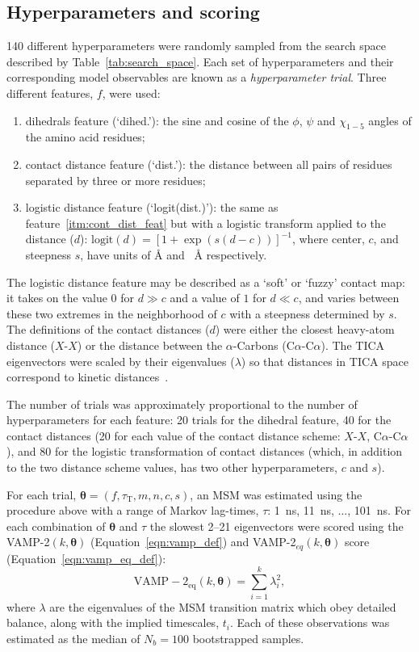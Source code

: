 \documentclass[journal=jacsat,manuscript=article]{achemso}
\begin{document}
\subsection{Hyperparameters and scoring}
\num{140} different hyperparameters were randomly sampled from the search space described by Table~\ref{tab:search_space}. Each set of hyperparameters and their corresponding model observables are known as a \emph{hyperparameter trial}. Three different features, $f$, were used: 
\begin{enumerate}
    \item dihedrals feature (`dihed.'): the sine and cosine of the $\phi$, $\psi$ and $\chi_{1-5}$ angles of the amino acid residues;
    \item contact distance feature (`dist.'): the distance between all pairs of residues separated by three or more residues; \label{itm:cont_dist_feat}
    \item logistic distance feature (`logit(dist.)'): the same as feature~\ref{itm:cont_dist_feat} but with a logistic transform applied to the distance ($d$): $\mathrm{logit}(d) = [1+\exp{(s(d-c))}]^{-1}$, where center, $c$, and steepness $s$,  have units of \si{\angstrom} and \si{\per\angstrom} respectively.
\end{enumerate}
The logistic distance feature may be described as a `soft' or `fuzzy' contact map: it takes on the value $0$ for $d \gg c$ and a value of $1$ for $d\ll c$, and varies between these two extremes in the neighborhood of $c$ with a steepness determined by $s$. The definitions of the contact distances ($d$) were either the closest heavy-atom distance ($X$-$X$) or the distance between the $\alpha$-Carbons (C$\alpha$-C$\alpha$). The TICA eigenvectors were scaled by their eigenvalues ($\lambda$) so that distances in TICA space correspond to kinetic distances~\cite{noeKineticDistanceKinetic2015}.

The number of trials was approximately proportional to the number of hyperparameters for each feature: 20 trials for the dihedral feature, 40 for the contact distances (20 for each value of the contact distance scheme: $X$-$X$,  C$\alpha$-C$\alpha$), and 80 for the logistic transformation of contact distances (which, in addition to the two distance scheme values, has two other hyperparameters, $c$ and $s$). 

For each trial,  $\bm{\theta} = (f, \tau_{\mathrm{T}}, m, n, c, s)$,  an MSM was estimated using the procedure above with a range of Markov lag-times, $\tau$: \SI{1}{\nano\second}, \SI{11}{\nano\second}, ..., \SI{101}{\nano\second}. For each combination of $\bm{\theta}$ and  $\tau$ the slowest \numrange{2}{21} eigenvectors were scored using the VAMP-2$(k, \bm{\theta})$ (Equation~\ref{eqn:vamp_def}) and  VAMP-2$_{eq}(k, \bm{\theta})$ score (Equation~\ref{eqn:vamp_eq_def}):
\begin{equation}
    \operatorname{VAMP-2_{eq}}(k, \bm{\theta}) = \sum_{i=1}^{k}\lambda_{i}^{2}, \label{eqn:vamp_eq_def}
\end{equation}
where $\lambda$ are the eigenvalues of the MSM transition matrix which obey detailed balance, along with the implied timescales, $t_i$.  Each of these observations was estimated as the median of $N_b=100$ bootstrapped samples. 
\end{document}
